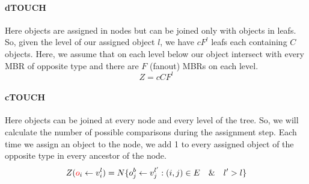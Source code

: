 \documentclass{sig-alternate}
\begin{document}
\paragraph{dTOUCH} Here objects are assigned in nodes but can be joined only with objects in leafs. So, given the level of our assigned object $l$, we have $cF^l$ leafs each containing $C$ objects. Here, we assume that on each level below our object intersect with every MBR of opposite type and there are $F$ (fanout) MBRs on each level. 
$$ Z = cCF^l$$
\paragraph{cTOUCH}
Here objects can be joined at every node and every level of the tree. So, we will calculate the number of possible comparisons during the assignment step. Each time we assign an object to the node, we add 1 to every assigned object of the opposite type in every ancestor of the node.
$$Z(\textcolor{red}{o}_i \leftarrow v^l_i) = N\{o^b_j \leftarrow v^{l'}_j : (i,j) \in E \quad \& \quad l' > l\}$$ 


%
%
\end{document}
